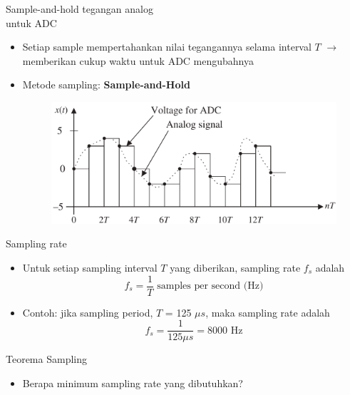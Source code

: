 \documentclass[pdflatex,compress,mathserif]{beamer}
\begin{document}
\begin{frame}{Sample-and-hold tegangan analog\\untuk ADC}
    \begin{itemize}
        \item Setiap sample mempertahankan nilai tegangannya selama interval $T$ $\rightarrow$ memberikan cukup waktu untuk ADC mengubahnya
        \item Metode sampling: \textbf{Sample-and-Hold}
        \begin{figure}
            \includegraphics[width=0.9\linewidth]{./img/img03.png}
        \end{figure}
    \end{itemize}
\end{frame}

\begin{frame}{Sampling rate}
    \begin{itemize}
        \item Untuk setiap sampling interval $T$ yang diberikan, sampling rate $f_s$ adalah
        \begin{equation}
            f_s = \frac{1}{T} \text{ samples per second (Hz)}
        \end{equation}
        \item Contoh: jika sampling period, $T$ = 125 $\mu s$, maka sampling rate adalah $$ f_s = \frac{1}{125 \mu s} = 8000 \text{ Hz} $$
    \end{itemize}
\end{frame}

\begin{frame}{Teorema Sampling}
    \begin{itemize}
        \item Berapa minimum sampling rate yang dibutuhkan?
    \end{itemize}    
\end{frame}
\end{document}
